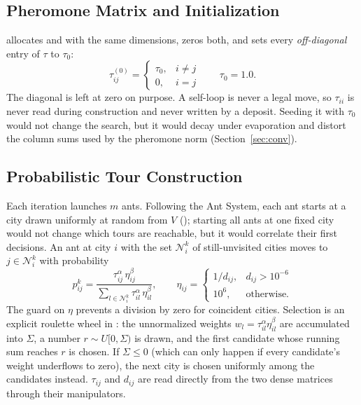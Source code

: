 \documentclass[11pt,a4paper]{article}
\begin{document}
\subsection{Pheromone Matrix and Initialization}
 allocates  and  with the same
dimensions, zeros both, and sets every \emph{off-diagonal} entry of $\tau$ to $\tau_0$:
\begin{equation}
\tau_{ij}^{(0)}=\begin{cases}\tau_0, & i\neq j\\ 0, & i=j\end{cases}\qquad \tau_0=1.0 .
\end{equation}
The diagonal is left at zero on purpose. A self-loop is never a legal move, so $\tau_{ii}$ is never read
during construction and never written by a deposit. Seeding it with $\tau_0$ would not change the search,
but it would decay under evaporation and distort the column sums used by the pheromone norm
(Section~\ref{sec:conv}).

\subsection{Probabilistic Tour Construction}
Each iteration launches $m$ ants. Following the Ant System, each ant starts at a city drawn uniformly at
random from $V$ (); starting all ants at one fixed city would not change which tours
are reachable, but it would correlate their first decisions. An ant at city $i$ with the set
$\mathcal N_i^k$ of still-unvisited cities moves to $j\in\mathcal N_i^k$ with probability
\begin{equation}
p_{ij}^k=\frac{\tau_{ij}^{\alpha}\,\eta_{ij}^{\beta}}{\sum_{l\in\mathcal N_i^k}\tau_{il}^{\alpha}\,\eta_{il}^{\beta}},
\qquad
\eta_{ij}=\begin{cases}1/d_{ij}, & d_{ij}>10^{-6}\\ 10^{6}, & \text{otherwise.}\end{cases}
\label{eq:prob}
\end{equation}
The guard on $\eta$ prevents a division by zero for coincident cities. Selection is an explicit roulette
wheel in : the unnormalized weights $w_l=\tau_{il}^{\alpha}\eta_{il}^{\beta}$ are
accumulated into $\Sigma$, a number $r\sim U[0,\Sigma)$ is drawn, and the first candidate whose running
sum reaches $r$ is chosen. If $\Sigma\le 0$ (which can only happen if every candidate's weight underflows to zero), the
next city is chosen uniformly among the candidates instead. $\tau_{ij}$ and $d_{ij}$ are read directly from
the two dense matrices through their manipulators.
\end{document}
